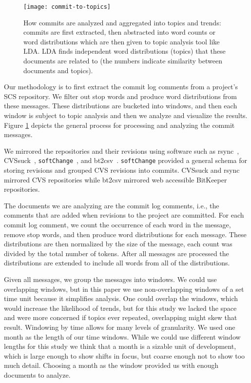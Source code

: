 \documentclass[times, 10pt,twocolumn]{article}
\newcommand{\shrinkit}{\vspace*{-.3em}}
\begin{document}
\shrinkit
{}
\shrinkit


\begin{figure}[t]
  \centering
  \texttt{[image: commit-to-topics]} 
  \caption{How commits are analyzed and aggregated into topics and trends: commits are first extracted, then abstracted into word counts or word distributions which are then given to topic analysis tool like LDA. LDA finds independent word distributions (topics) that these documents are related to (the numbers indicate similarity between documents and topics).}
  \label{fig:commits}
\end{figure}



Our methodology is to first extract the commit log comments from a
project's SCS repository. We filter out stop words and produce word
distributions from these messages. These distributions are bucketed
into windows, and then each window is subject to topic analysis and
then we analyze and visualize the results. Figure \ref{fig:commits}
depicts the general process for processing and analyzing the commit
messages.




\shrinkit
{}
\shrinkit


We mirrored the repositories and their revisions using software such
as rsync~\cite{rsync}, CVSsuck~\cite{cvssuck},
\texttt{softChange}~\cite{dmgseke2004short}, and bt2csv~\cite{methodology}.
\texttt{softChange} provided a general schema for storing revisions
and grouped CVS revisions into commits. CVSsuck and rsync mirrored CVS
repositories while bt2csv mirrored web accessible BitKeeper
repositories.



The documents we are analyzing are the commit log comments, i.e., the
comments that are added when revisions to the project are committed.
For each commit log comment, we count the occurrence of each word in
the message, remove stop words, and then produce word distributions
for each message.  These distributions are then normalized by the size
of the message, each count was divided by the total number of
tokens. After all messages are processed the distributions are
extended to include all words from all of the distributions.

\shrinkit
{}
\shrinkit

Given all messages, we group the messages into windows. We could use
overlapping windows, but in this paper we use non-overlapping windows
of a set time unit because it simplifies analysis.  
One could overlap the
windows, which would increase the likelihood of trends, but for this
study we lacked the space and were more concerned if topics ever
repeated, overlapping might skew that result.
Windowing by time
allows for many levels of granularity.  
We used one month as the
length of our time windows. While we could use different window
lengths for this study we think that a month is a sizable unit of
development, which is large enough to show shifts in focus, but coarse
enough not to show too much detail. Choosing a month as the window
provided us with enough documents to analyze. 
\end{document}
